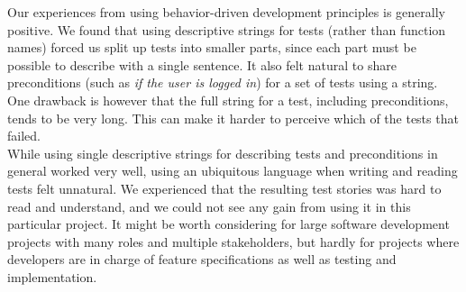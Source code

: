 Our experiences from using behavior-driven development principles is
generally positive. We found that using descriptive strings for tests
(rather than function names) forced us split up tests into smaller
parts, since each part must be possible to describe with a single
sentence. It also felt natural to share preconditions (such as \emph{if
the user is logged in}) for a set of tests using a string. One drawback
is however that the full string for a test, including preconditions,
tends to be very long. This can make it harder to perceive which of the
tests that failed.\\

While using single descriptive strings for describing tests and
preconditions in general worked very well, using an ubiquitous language
when writing and reading tests felt unnatural. We experienced that the
resulting test stories was hard to read and understand, and we could not
see any gain from using it in this particular project. It might be worth
considering for large software development projects with many roles and
multiple stakeholders, but hardly for projects where developers are in
charge of feature specifications as well as testing and
implementation.\\
